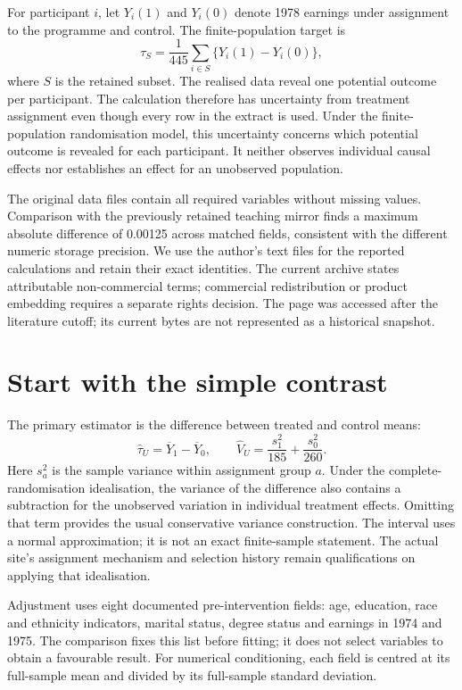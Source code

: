 For participant $i$, let $Y_i(1)$ and $Y_i(0)$ denote 1978 earnings under
assignment to the programme and control. The finite-population target is
\[
 \tau_S=\frac{1}{445}\sum_{i\in S}\{Y_i(1)-Y_i(0)\},
\]
where $S$ is the retained subset. The realised data reveal one potential
outcome per participant. The calculation therefore has uncertainty from treatment assignment
even though every row in the extract is used. Under the finite-population
randomisation model, this uncertainty concerns which potential outcome is
revealed for each participant. It neither observes individual
causal effects nor establishes an effect for an unobserved population.

The original data files contain all required variables without missing values.
Comparison with the previously retained teaching mirror finds a maximum
absolute difference of 0.00125 across matched fields, consistent with the
different numeric storage precision. We use the author's text files for the
reported calculations and retain their exact identities. The current archive
states attributable non-commercial terms; commercial redistribution or product
embedding requires a separate rights decision. The page was accessed after
the literature cutoff; its current bytes are not represented as a historical
snapshot. \citep{gap29data}

\section{Start with the simple contrast}
The primary estimator is the difference between treated and control means:
\[
 \widehat\tau_U=\overline Y_1-\overline Y_0,\qquad
 \widehat V_U=\frac{s_1^2}{185}+\frac{s_0^2}{260}.
\]
Here $s_a^2$ is the sample variance within assignment group $a$. Under the
complete-randomisation idealisation, the variance of the difference also
contains a subtraction for the unobserved variation in individual treatment
effects. Omitting that term provides the usual conservative variance
construction. The interval uses a normal approximation; it is not an exact
finite-sample statement. The actual site's assignment mechanism and selection
history remain qualifications on applying that idealisation.

Adjustment uses eight documented pre-intervention fields: age, education,
race and ethnicity indicators, marital status, degree status and earnings in
1974 and 1975. The comparison fixes this list before fitting; it does not
select variables to obtain a favourable result. For numerical conditioning,
each field is centred at its full-sample mean and divided by its full-sample
standard deviation.

